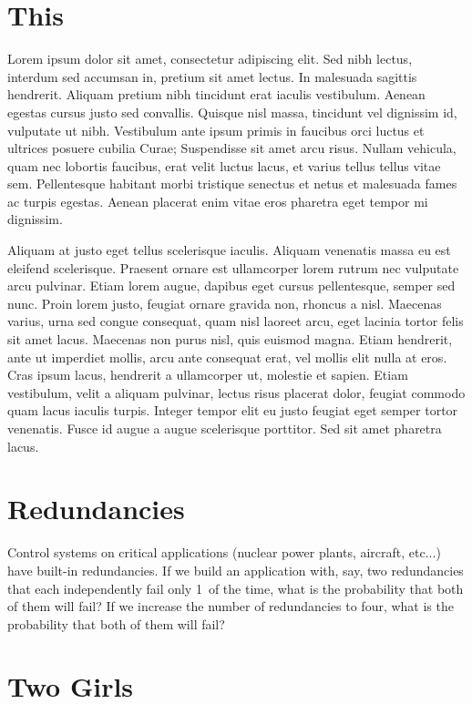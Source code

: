 \documentclass[12pt]{tufte-book}
\begin{document}
\mainmatter

\section{This}


Lorem ipsum dolor sit amet, consectetur adipiscing elit. Sed nibh lectus, interdum sed accumsan in, pretium sit amet lectus. In malesuada sagittis hendrerit. Aliquam pretium nibh tincidunt erat iaculis vestibulum. Aenean egestas cursus justo sed convallis. Quisque nisl massa, tincidunt vel dignissim id, vulputate ut nibh. Vestibulum ante ipsum primis in faucibus orci luctus et ultrices posuere cubilia Curae; Suspendisse sit amet arcu risus. Nullam vehicula, quam nec lobortis faucibus, erat velit luctus lacus, et varius tellus tellus vitae sem. Pellentesque habitant morbi tristique senectus et netus et malesuada fames ac turpis egestas. Aenean placerat enim vitae eros pharetra eget tempor mi dignissim.

Aliquam at justo eget tellus scelerisque iaculis. Aliquam venenatis massa eu est eleifend scelerisque. Praesent ornare est ullamcorper lorem rutrum nec vulputate arcu pulvinar. Etiam lorem augue, dapibus eget cursus pellentesque, semper sed nunc. Proin lorem justo, feugiat ornare gravida non, rhoncus a nisl. Maecenas varius, urna sed congue consequat, quam nisl laoreet arcu, eget lacinia tortor felis sit amet lacus. Maecenas non purus nisl, quis euismod magna. Etiam hendrerit, ante ut imperdiet mollis, arcu ante consequat erat, vel mollis elit nulla at eros. Cras ipsum lacus, hendrerit a ullamcorper ut, molestie et sapien. Etiam vestibulum, velit a aliquam pulvinar, lectus risus placerat dolor, feugiat commodo quam lacus iaculis turpis. Integer tempor elit eu justo feugiat eget semper tortor venenatis. Fusce id augue a augue scelerisque porttitor. Sed sit amet pharetra lacus.

\section{Redundancies}

Control systems on critical applications (nuclear power plants, aircraft, etc...) have built-in redundancies.  If we build an application with, say, two redundancies that each independently fail only 1\ of the time, what is the probability that both of them will fail?  If we increase the number of redundancies to four, what is the probability that both of them will fail?  

\section{Two Girls}
\end{document}
